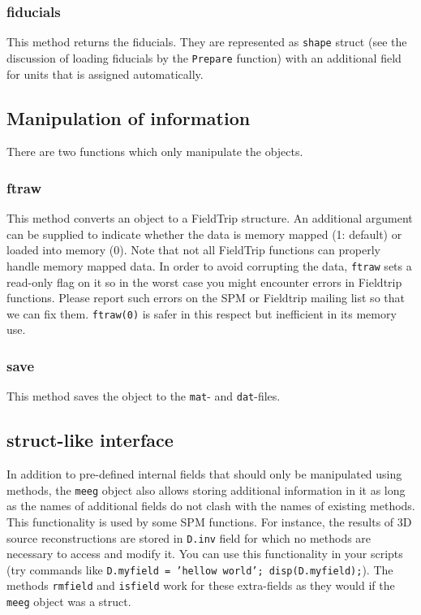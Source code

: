 \subsubsection{fiducials}
This method returns the fiducials. They are represented as \texttt{shape} struct (see the discussion of loading fiducials by the \texttt{Prepare} function) with an additional field for units that is assigned automatically.

\subsection{Manipulation of information}
There are two functions which only manipulate the objects.

\subsubsection{ftraw}
This method converts an object to a FieldTrip structure. An additional argument can be supplied to indicate whether the data is memory mapped (1: default) or loaded into memory (0). Note that not all FieldTrip functions can properly handle memory mapped data. In order to avoid corrupting the data, \texttt{ftraw} sets a read-only flag on it so in the worst case you might encounter errors in Fieldtrip functions. Please report such errors on the SPM or Fieldtrip mailing list so that we can fix them. \texttt{ftraw(0)} is safer in this respect but inefficient in its memory use.

\subsubsection{save}
This method saves the object to the \texttt{mat}- and \texttt{dat}-files.

\subsection{struct-like interface}
In addition to pre-defined internal fields that should only be manipulated using methods, the \texttt{meeg} object also allows storing additional information in it as long as the names of additional fields do not clash with the names of existing methods. This functionality is used by some SPM functions. For instance, the results of 3D source reconstructions are stored in \texttt{D.inv} field for which no methods are necessary to access and modify it. You can use this functionality in your scripts (try commands like \texttt{D.myfield = 'hellow world'; disp(D.myfield);}). The methods \texttt{rmfield} and \texttt{isfield} work for these extra-fields as they would if the \texttt{meeg} object was a struct.

